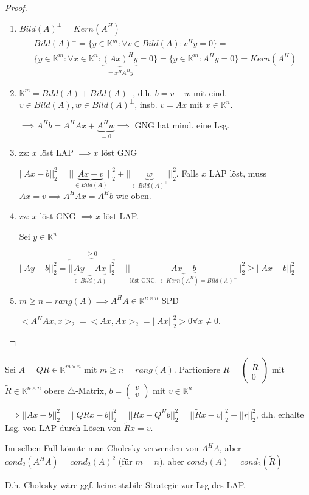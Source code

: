 \begin{proof}
	\begin{enumerate}
		\item $Bild(A)^\perp = Kern(A^H)$
		\begin{align*}
			Bild(A)^\perp = \{y \in \mathbb{K}^m: \forall v \in Bild(A) : v^Hy = 0\} =\\
			\{y \in \mathbb{K}^m: \forall x \in \mathbb{K}^n: \underbrace{(Ax)^Hy}_{=x^HA^Hy} = 0\} =
			\{y \in \mathbb{K}^m: A^Hy = 0\} = 
			Kern(A^H)
		\end{align*}
		
		\item $\mathbb{K}^m = Bild(A) + Bild(A)^\perp$, d.h. $b=v+w$ mit eind. $v \in Bild(A), w \in Bild(A)^\perp$, insb. $v=Ax$ mit $x \in \mathbb{K}^n$.
		
		$\implies A^Hb = A^HAx + \underbrace{A^Hw}_{=0} \implies$ GNG hat mind. eine Lsg.
		
		\item zz: $x$ löst LAP $\implies x$ löst GNG
		
		$||Ax-b||_2^2 = ||\underbrace{Ax - v}_{\in Bild(A)}||_2^2 + ||\underbrace{w}_{\in Bild(A)^\perp}||_2^2$. Falls $x$ LAP löst, muss $Ax=v \implies A^HAx = A^Hb$ wie oben.
		
		\item zz: $x$ löst GNG $\implies x$ löst LAP.
		
		Sei $y \in \mathbb{K}^n$
		
		$||Ay - b||_2^2 = \overbrace{||\underbrace{Ay - Ax}_{\in Bild(A)}||_2^2}^{\geq 0} + ||\underbrace{Ax - b}_{\text{löst GNG, } \in Kern(A^H) = Bild(A)^\perp}||_2^2 \geq ||Ax - b||_2^2$
		
		\item $m \geq n = rang(A) \implies A^HA \in \mathbb{K}^{n\times n}$ SPD
		
		$<A^HAx, x>_2 = <Ax,Ax>_2 = ||Ax||_2^2 > 0 \forall x \neq 0$.
	\end{enumerate}
\end{proof}

\begin{remark}
	Sei $A = QR \in \mathbb{K}^{m\times n}$ mit $m \geq n = rang(A)$. Partioniere $R = \left(\begin{matrix}
		\tilde{R}\\ 0
	\end{matrix}\right)$ mit $\tilde{R} \in \mathbb{K}^{n\times n}$ obere $\triangle$-Matrix, $b = \left(\begin{matrix}
		v\\ v
	\end{matrix}\right)$ mit $v \in \mathbb{K}^n$
	
	$\implies ||Ax-b||_2^2 = ||QR x - b||_2^2 = ||Rx - Q^Hb||_2^2  =||\tilde{R}x - v||_2^2 + ||r||_2^2$, d.h. erhalte Lsg. von LAP durch Lösen von $\tilde{R}x = v$.
\end{remark}

\begin{remark}
	Im selben Fall könnte man Cholesky verwenden von $A^HA$, aber $cond_2(A^HA) = cond_2(A)^2$ (für $m=n$), aber $cond_2(A) = cond_2(\tilde{R})$
	
	D.h. Cholesky wäre ggf. keine stabile Strategie zur Lsg des LAP.
\end{remark}


